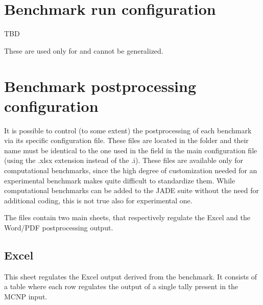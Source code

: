 \documentclass[letterpaper,10pt,english]{sphinxmanual}
\let\sphinxpxdimen\pdfpxdimen\else\newdimen\sphinxpxdimen
\begin{document}
\section{Benchmark run configuration}
\label{\detokenize{usage/configuration:benchmark-run-configuration}}\label{\detokenize{usage/configuration:runconf}}
TBD

These are used only for  and cannot be generalized.


\section{Benchmark post\sphinxhyphen{}processing configuration}
\label{\detokenize{usage/configuration:benchmark-post-processing-configuration}}\label{\detokenize{usage/configuration:ppconf}}
It is possible to control (to some extent) the post\sphinxhyphen{}processing of each benchmark via its
specific configuration file. These files are located in the 
folder and their name must be identical to the one used in the  field in the main configuration file
(using the .xlsx extension instead of the .i). These files are available only for computational benchmarks,
since the high degree of customization needed for an experimental benchmark makes quite difficult to
standardize them. While computational benchmarks can be added to the JADE suite without the need for additional
coding, this is not true also for experimental one.

The files contain two main sheets, that respectively regulate the Excel and the Word/PDF post\sphinxhyphen{}processing output.


\subsection{Excel}
\label{\detokenize{usage/configuration:excel}}
\noindent\sphinxincludegraphics[width=600\sphinxpxdimen]{{excelbench}.png}

This sheet regulates the Excel output derived from the benchmark. It consists of a table where each row regulates
the output of a single tally present in the MCNP input.
\end{document}
